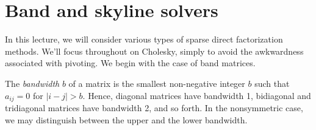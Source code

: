\documentclass[12pt, leqno]{article} %
\begin{document}

\section{Band and skyline solvers}

In this lecture, we will consider various types of sparse direct
factorization methods.  We'll focus throughout on Cholesky, simply to
avoid the awkwardness associated with pivoting.  We begin with the
case of band matrices.

The {\em bandwidth} $b$ of a matrix is the smallest non-negative
integer $b$ such that $a_{ij} = 0$ for $|i-j| > b$.  Hence, diagonal
matrices have bandwidth 1, bidiagonal and tridiagonal matrices have
bandwidth 2, and so forth.  In the nonsymmetric case, we may
distinguish between the upper and the lower bandwidth.
\end{document}
